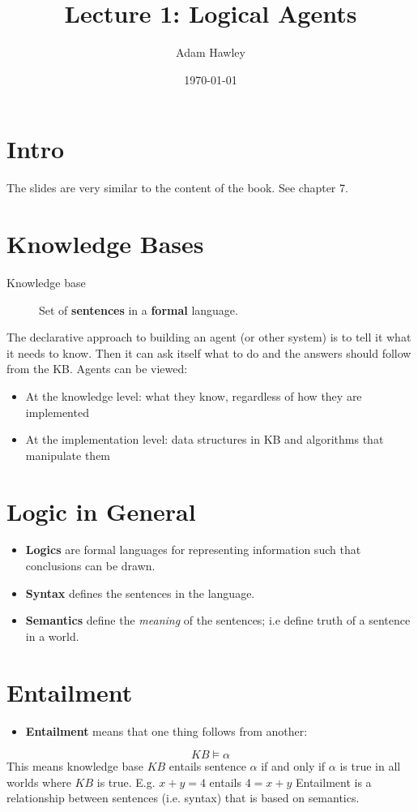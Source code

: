 \documentclass[11pt]{article}
\author{Adam Hawley}
\date{\today}
\title{Lecture 1: Logical Agents}
\begin{document}
\maketitle
\tableofcontents


\section{Intro}
\label{sec:org1ef4d80}
The slides are very similar to the content of the book.
See chapter 7.

\section{Knowledge Bases}
\label{sec:org0ba973e}
\begin{description}
\item[{Knowledge base}] Set of \textbf{sentences} in a \textbf{formal} language.
\end{description}
The declarative approach to building an agent (or other system) is to tell it what it needs to know.
Then it can ask itself what to do and the answers should follow from the KB.
Agents can be viewed:
\begin{itemize}
\item At the knowledge level: what they know, regardless of how they are implemented
\item At the implementation level: data structures in KB and algorithms that manipulate them
\end{itemize}

\section{Logic in General}
\label{sec:orgfc2d17b}
\begin{itemize}
\item \textbf{Logics} are formal languages for representing information such that conclusions can be drawn.
\item \textbf{Syntax} defines the sentences in the language.
\item \textbf{Semantics} define the \emph{meaning} of the sentences; i.e define truth of a sentence in a world.
\end{itemize}

\section{Entailment}
\label{sec:orgbd8529e}
\begin{itemize}
\item \textbf{Entailment} means that one thing follows from another:
\end{itemize}
\begin{equation}
KB \models \alpha
\end{equation}
This means knowledge base \(KB\) entails sentence \(\alpha\) if and only if \(\alpha\) is true in all worlds where \(KB\) is true.
E.g. \(x + y = 4\) entails \(4 = x + y\)
Entailment is a relationship between sentences (i.e. syntax) that is based on semantics.
\end{document}
